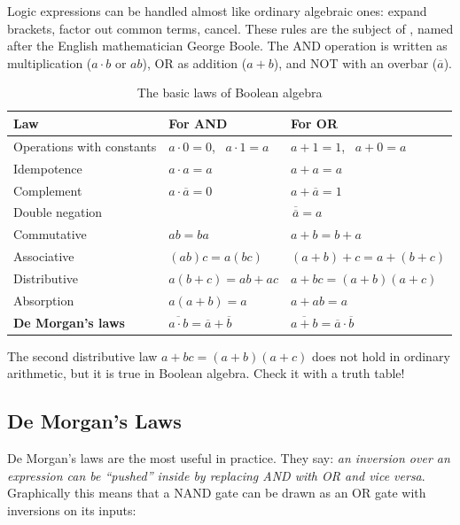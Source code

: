 Logic expressions can be handled almost like ordinary
algebraic ones: expand brackets, factor out common terms, cancel.
These rules are the subject of , named after the
English mathematician George Boole. The AND operation is written as multiplication
($a\cdot b$ or $ab$), OR as addition ($a+b$), and NOT with an overbar
($\overline{a}$).

\begin{table}[H]
\centering
\caption{The basic laws of Boolean algebra}
\label{tab:bool}
\begin{tabular}{l l l}
\toprule
\textbf{Law} & \textbf{For AND} & \textbf{For OR} \\
\midrule
Operations with constants & $a\cdot 0 = 0$, \ $a\cdot 1 = a$ & $a+1 = 1$, \ $a+0 = a$ \\
Idempotence            & $a\cdot a = a$ & $a+a = a$ \\
Complement             & $a\cdot\overline{a} = 0$ & $a+\overline{a} = 1$ \\
Double negation        & \multicolumn{2}{c}{$\overline{\overline{a}} = a$} \\
Commutative            & $ab = ba$ & $a+b = b+a$ \\
Associative            & $(ab)c = a(bc)$ & $(a+b)+c = a+(b+c)$ \\
Distributive           & $a(b+c) = ab+ac$ & $a+bc = (a+b)(a+c)$ \\
Absorption             & $a(a+b) = a$ & $a+ab = a$ \\
\textbf{De Morgan's laws} & $\overline{a\cdot b} = \overline{a}+\overline{b}$ & $\overline{a+b} = \overline{a}\cdot\overline{b}$ \\
\bottomrule
\end{tabular}
\end{table}

\begin{warnbox}
The second distributive law $a+bc = (a+b)(a+c)$ does not hold in ordinary
arithmetic, but it is true in Boolean algebra. Check it with a truth table!
\end{warnbox}

\subsection{De Morgan's Laws}

De Morgan's laws are the most useful in practice. They say: \emph{an inversion
over an expression can be ``pushed'' inside by replacing AND with OR and vice versa}.
Graphically this means that a NAND gate can be drawn as an OR gate with
inversions on its inputs:

